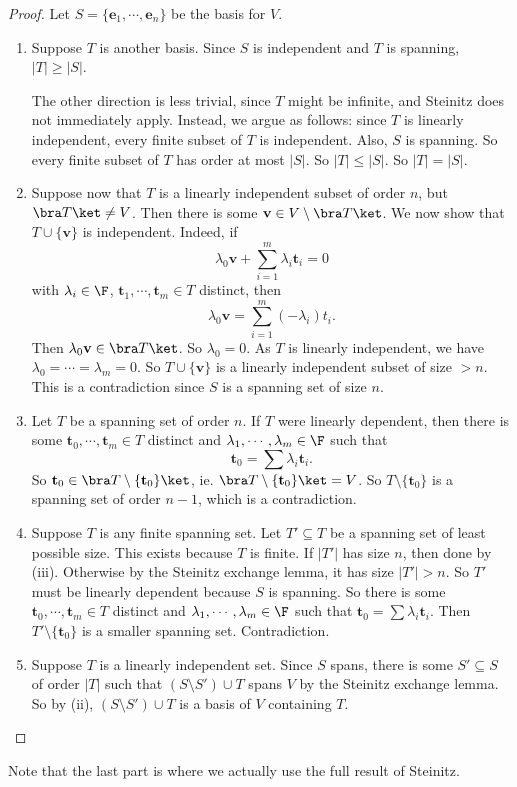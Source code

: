 \documentclass[a4paper]{article}
\begin{document}
\begin{proof}
  Let $S = \{\mathbf{e}_1, \cdots, \mathbf{e}_n\}$ be the basis for $V$.
  \begin{enumerate}
    \item Suppose $T$ is another basis. Since $S$ is independent and $T$ is spanning, $|T| \geq |S|$.

      The other direction is less trivial, since $T$ might be infinite, and Steinitz does not immediately apply. Instead, we argue as follows: since $T$ is linearly independent, every finite subset of $T$ is independent. Also, $S$ is spanning. So every finite subset of $T$ has order at most $|S|$. So $|T| \leq |S|$. So $|T| = |S|$.

    \item Suppose now that $T$ is a linearly independent subset of order $n$, but $\bra T\ket \not= V$. Then there is some $\mathbf{v} \in V\setminus \bra T\ket$. We now show that $T\cup \{\mathbf{v}\}$ is independent. Indeed, if
      \[
        \lambda_0 \mathbf{v} + \sum_{i = 1}^m \lambda_i \mathbf{t}_i = 0
      \]
      with $\lambda_i \in \F$, $\mathbf{t}_1, \cdots, \mathbf{t}_m\in T$ distinct, then
      \[
        \lambda_0 \mathbf{v} = \sum_{i = 1}^m (-\lambda_i) t_i.
      \]
      Then $\lambda_0 \mathbf{v} \in \bra T\ket$. So $\lambda_0= 0$. As $T$ is linearly independent, we have $\lambda_0 = \cdots = \lambda_m = 0$. So $T\cup \{\mathbf{v}\}$ is a linearly independent subset of size $> n$. This is a contradiction since $S$ is a spanning set of size $n$.

    \item Let $T$ be a spanning set of order $n$. If $T$ were linearly dependent, then there is some $\mathbf{t}_0, \cdots, \mathbf{t}_m \in T$ distinct and $\lambda_1, \cdots, \lambda_m \in \F$ such that
      \[
        \mathbf{t}_0 = \sum \lambda_i \mathbf{t}_i.
      \]
      So $\mathbf{t}_0 \in \bra T\setminus \{\mathbf{t}_0\}\ket$, ie. $\bra T\setminus \{\mathbf{t}_0\} \ket = V$. So $T\setminus \{\mathbf{t}_0\}$ is a spanning set of order $n - 1$, which is a contradiction.

    \item Suppose $T$ is any finite spanning set. Let $T' \subseteq T$ be a spanning set of least possible size. This exists because $T$ is finite. If $|T'|$ has size $n$, then done by (iii). Otherwise by the Steinitz exchange lemma, it has size $|T'| > n$. So $T'$ must be linearly dependent because $S$ is spanning. So there is some $\mathbf{t}_0, \cdots, \mathbf{t}_m \in T$ distinct and $\lambda_1, \cdots, \lambda_m \in \F$ such that $\mathbf{t}_0 = \sum \lambda_i \mathbf{t}_i$. Then $T'\setminus \{\mathbf{t}_0\}$ is a smaller spanning set. Contradiction.

    \item Suppose $T$ is a linearly independent set. Since $S$ spans, there is some $S' \subseteq S$ of order $|T|$ such that $(S\setminus S')\cup T$ spans $V$ by the Steinitz exchange lemma. So by (ii), $(S\setminus S')\cup T$ is a basis of $V$ containing $T$.
  \end{enumerate}
\end{proof}
Note that the last part is where we actually use the full result of Steinitz.
\end{document}
